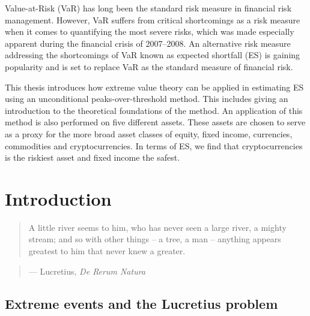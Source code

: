 \documentclass[a4paper,11pt]{article}
\theoremstyle{definition}
\theoremstyle{definition}
\theoremstyle{definition}
\theoremstyle{definition}
\theoremstyle{remark}
\begin{document}
Value-at-Risk (VaR) has long been the standard risk measure in financial risk management. However, VaR suffers from critical shortcomings as a risk measure when it comes to quantifying the most severe risks, which was made especially apparent during the financial crisis of 2007--2008. An alternative risk measure addressing the shortcomings of VaR known as expected shortfall (ES) is gaining popularity and is set to replace VaR as the standard measure of financial risk.

This thesis introduces how extreme value theory can be applied in estimating ES using an unconditional peaks-over-threshold method. This includes giving an introduction to the theoretical foundations of the method. An application of this method is also performed on five different assets. These assets are chosen to serve as a proxy for the more broad asset classes of equity, fixed income, currencies, commodities and cryptocurrencies. In terms of ES, we find that cryptocurrencies is the riskiest asset and fixed income the safest.

\newpage
\tableofcontents
\clearpage


\newpage
\listoffigures
{}

\newpage
\listoftables
{}

\newpage
\pagestyle{plain}       
\setcounter{page}{1}    %

\hypertarget{introduction}{%
\section{Introduction}\label{introduction}}
\begin{quote}
A little river seems to him, who has never seen a large river, a mighty stream; and so with other things -- a tree, a man -- anything appears greatest to him that never knew a greater.
\end{quote}
\begin{quote}
\hfill --- Lucretius, \emph{De Rerum Natura}
\end{quote}
\hypertarget{extreme-events-and-the-lucretius-problem}{%
\subsection{Extreme events and the Lucretius problem}\label{extreme-events-and-the-lucretius-problem}}
\end{document}
